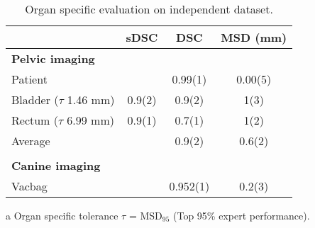 \begin{table}[!htbp]
\footnotesize
\caption{Organ specific evaluation on independent dataset.}
\begin{threeparttable}[t]
  \centering
    \begin{tabular}{l c c c}
      & sDSC  & DSC         & MSD (mm)   \\
    \hline


    \textbf{Pelvic imaging}\tnote{a}     &              &              &       \\
    Patient                      &              & 0.99(1) & 0.00(5)  \\
    Bladder ($\tau$ 1.46 mm)     & 0.9(2)     & 0.9(2)     & 1(3)       \\
    Rectum ($\tau$ 6.99 mm)      & 0.9(1)     & 0.7(1)     & 1(2)       \\
    Average                      &              & 0.9(2)     & 0.6(2)   \\ \\
    \textbf{Canine imaging}      &              &              &           \\
    Vacbag                       &              & 0.952(1) & 0.2(3)    \\
    \hline
  \end{tabular}
  \begin{tablenotes}
    \scriptsize
  \item[a]Organ specific tolerance $\tau$ = MSD$_{95}$ (Top 95\% expert performance).
  \end{tablenotes}
\end{threeparttable}%
\label{tab:addlabel}%
\end{table}%
